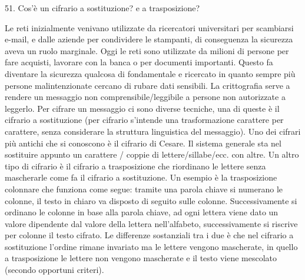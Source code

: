 51.	Cos’è un cifrario a sostituzione? e a trasposizione?

Le reti inizialmente venivano utilizzate da ricercatori universitari per scambiarsi e-mail, e dalle aziende per condividere le stampanti, di conseguenza la sicurezza aveva un ruolo marginale.
Oggi le reti sono utilizzate da milioni di persone per fare acquisti, lavorare con la banca o per documenti importanti. Questo fa diventare la sicurezza qualcosa di fondamentale e ricercato in quanto sempre più persone malintenzionate cercano di rubare dati sensibili.
La crittografia serve a rendere un messaggio non comprensibile/leggibile a persone non autorizzate a leggerlo.
Per cifrare un messaggio ci sono diverse tecniche, una di queste è il cifrario a sostituzione (per cifrario s’intende una trasformazione carattere per carattere, senza considerare la struttura linguistica del messaggio). Uno dei cifrari più antichi che si conoscono è il cifrario di Cesare.
Il sistema generale sta nel sostituire appunto un carattere / coppie di lettere/sillabe/ecc. con altre.
Un altro tipo di cifrario è il cifrario a trasposizione che riordinano le lettere senza mascherarle come fa il cifrario a sostituzione.
Un esempio è la trasposizione colonnare che funziona come segue: tramite una parola chiave si numerano le colonne, il testo in chiaro va disposto di seguito sulle colonne. Successivamente si ordinano le colonne in base alla parola chiave, ad ogni lettera viene dato un valore dipendente dal valore della lettera nell’alfabeto, successivamente si riscrive per colonne il testo cifrato.
Le differenze sostanziali tra i due è che nel cifrario a sostituzione l’ordine rimane invariato ma le lettere vengono mascherate, in quello a trasposizione le lettere non vengono mascherate e il testo viene mescolato (secondo opportuni criteri).
